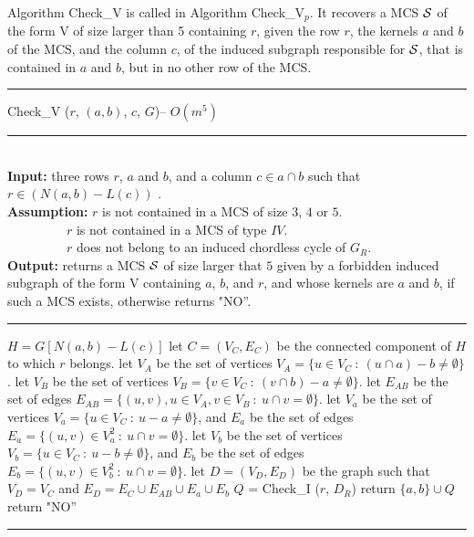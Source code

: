 \documentclass{article}
\begin{document}
Algorithm Check\_V is called in Algorithm Check\_V$_p$. It recovers a MCS
${\cal S}$ of the form V of size larger than 5 containing $r$, given the 
row $r$,  the kernels $a$ and $b$ of the MCS, and the column $c$, of the 
induced subgraph responsible for ${\cal S}$, that is contained in $a$ and 
$b$, but in no other row of the MCS.

\begin{algorithm} [htpb]                   
\rule{11.7cm}{0.01cm}
\caption{Check\_V ($r$, $(a,b)$, $c$, $G$)-- $O(m^5)$}
\rule{11.7cm}{0.01cm}
\\
{\bf Input:} three rows $r$, $a$ and $b$, and a column $c\in a\cap b$ such that
 $r \in (N(a,b)-L(c))$ .\\
{\bf Assumption:}  $r$ is not contained in a MCS of size $3$, $4$ or $5$.\\
$~~~~~~~~~~~~~~~~~~~~~r$ is not contained in a MCS of type $IV$.\\
$~~~~~~~~~~~~~~~~~~~~~r$ does not belong to an induced chordless cycle of $G_R$.\\
{\bf Output:} returns a MCS ${\cal S}$ of size larger that $5$ given by a 
forbidden induced subgraph of the form V containing $a$, $b$, and $r$, and 
whose kernels are $a$ and $b$, if such a MCS exists, otherwise returns  "NO''.
\rule{11.7cm}{0.01cm}
\begin{algorithmic}[1] 
\STATE $H = G[N(a,b)-L(c)]$
\STATE let $C=(V_C,E_C)$ be the connected component of $H$ to which $r$ belongs.
\STATE let $V_A$ be the set of vertices $V_A= \{u\in V_C ~:~ (u\cap a)-b \neq \emptyset \}$.
\STATE let $V_B$ be the set of vertices $V_B= \{v\in V_C ~:~ (v\cap b)-a \neq \emptyset \}$.
\STATE let $E_{AB}$ be the set of edges $E_{AB}= \{(u,v), u \in V_A, v \in V_B ~:~  u\cap v = \emptyset\}$.
\STATE let $V_a$ be the set of vertices  $V_a= \{u\in V_C ~:~ u-a \neq \emptyset\}$, and $E_a$ be the set of edges $E_a= \{(u,v)\in V_a^2 ~:~  u\cap v = \emptyset\}$.
\STATE let $V_b$ be the set of vertices  $V_b= \{u\in V_C ~:~ u-b \neq \emptyset\}$, and $E_b$ be the set of edges $E_b= \{(u,v)\in V_b^2 ~:~  u\cap v = \emptyset\}$.
\STATE let $D=(V_D,E_D)$ be the graph such that $V_D = V_C$ and $E_D=E_C\cup E_{AB}\cup E_a\cup E_b$ 
\STATE $Q$ =  Check\_I ($r$, $D_R$)
\STATE return $\{a,b\}\cup Q$
\ENDIF
\STATE return "NO''
\end{algorithmic}
\rule{11.7cm}{0.01cm}
\end{algorithm}
\end{document}
